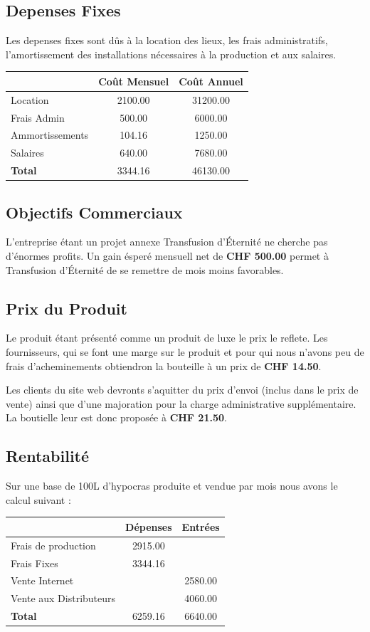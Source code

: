 \documentclass[10pt,a4paper]{article}
\newcommand{\tde}{Transfusion d'Éternité}
\begin{document}
\subsection{Depenses Fixes}
Les depenses fixes sont dûs à la location des lieux, les frais administratifs, l'amortissement des installations nécessaires à la production et aux salaires.

\vspace{0.5cm}
\begin{tabular}{|l|S[table-format=3.2]|S[table-format=3.2]|}
\hline
& \textbf{Coût Mensuel} & \textbf{Coût Annuel} \\\hline
Location & 2100.00 & 31200.00\\
Frais Admin & 500.00 & 6000.00 \\
Ammortissements & 104.16 & 1250.00\\
Salaires & 640.00 & 7680.00 \\\hline
\textbf{Total} & 3344.16 & 46130.00 \\\hline
\end{tabular}

\subsection{Objectifs Commerciaux}
L'entreprise étant un projet annexe \tde{} ne cherche pas d'énormes profits.
Un gain ésperé mensuell net de \textbf{CHF 500.00} permet à \tde{} de se remettre de mois moins favorables.
\subsection{Prix du Produit}
Le produit étant présenté comme un produit de luxe le prix le reflete.
Les fournisseurs, qui se font une marge sur le produit et pour qui nous n'avons peu de frais d'acheminements obtiendron la bouteille à un prix de \textbf{CHF 14.50}.

Les clients du site web devronts s'aquitter du prix d'envoi (inclus dans le prix de vente) ainsi que d'une majoration pour la charge administrative supplémentaire.
La boutielle leur est donc proposée à \textbf{CHF 21.50}.
\subsection{Rentabilité}
Sur une base de 100L d'hypocras produite et vendue par mois nous avons le calcul suivant :

\vspace{0.5cm}
\begin{tabular}{|l|S[table-format=3.2]|S[table-format=3.2]|}
\hline
& \textbf{Dépenses} & \textbf{Entrées} \\\hline
Frais de production & 2915.00 & \\
Frais Fixes & 3344.16 & \\
Vente Internet & & 2580.00 \\
Vente aux Distributeurs & & 4060.00 \\\hline
\textbf{Total} & 6259.16 & 6640.00 \\\hline
\end{tabular}
\end{document}
